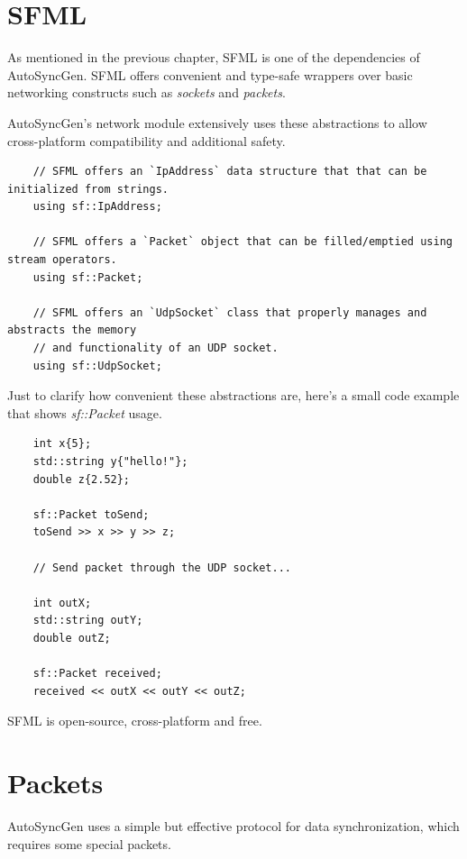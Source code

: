\documentclass{report}
\begin{document}
        \section{SFML}
            As mentioned in the previous chapter, SFML is one of the dependencies of AutoSyncGen. 
            SFML offers convenient and type-safe wrappers over basic networking constructs such as \emph{sockets} and \emph{packets}.

            AutoSyncGen's network module extensively uses these abstractions to allow cross-platform compatibility and additional safety.

            \begin{verbatim}
    // SFML offers an `IpAddress` data structure that that can be initialized from strings.
    using sf::IpAddress;
    
    // SFML offers a `Packet` object that can be filled/emptied using stream operators.
    using sf::Packet;

    // SFML offers an `UdpSocket` class that properly manages and abstracts the memory 
    // and functionality of an UDP socket.
    using sf::UdpSocket;
            \end{verbatim}

            Just to clarify how convenient these abstractions are, here's a small code example that shows \emph{sf::Packet} usage.

            \begin{verbatim}
    int x{5};
    std::string y{"hello!"};
    double z{2.52};

    sf::Packet toSend;
    toSend >> x >> y >> z;

    // Send packet through the UDP socket...

    int outX; 
    std::string outY;
    double outZ;
    
    sf::Packet received;
    received << outX << outY << outZ;
            \end{verbatim}

            SFML is open-source, cross-platform and free.

        \section{Packets}
            AutoSyncGen uses a simple but effective protocol for data synchronization, which requires some special packets.
\end{document}
